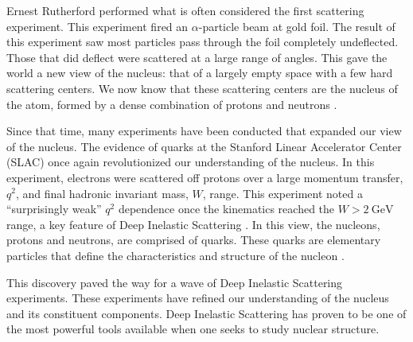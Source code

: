 
Ernest Rutherford performed what is often considered the first scattering experiment. This experiment fired an $\alpha$-particle beam at gold foil. The result of this experiment saw most particles pass through the foil completely undeflected. Those that did deflect were scattered at a large range of angles. This gave the world a new view of the nucleus: that of a largely empty space with a few hard scattering centers. We now know that these scattering centers are the nucleus of the atom, formed by a dense combination of protons and neutrons \cite{GRIF}.

Since that time, many experiments have been conducted that expanded our view of the nucleus. The evidence of quarks at the Stanford Linear Accelerator Center (SLAC) once again revolutionized our understanding of the nucleus. In this experiment, electrons were scattered off protons over a large momentum transfer, $q^2$, and final hadronic invariant mass, $W$, range. This experiment noted a ``surprisingly weak'' $q^2$ dependence once the kinematics reached the $W>2\ \textrm{GeV}$ range, a key feature of Deep Inelastic Scattering \cite{SLAC_DIS}. In this view, the nucleons, protons and neutrons, are comprised of quarks. These quarks are elementary particles that define the characteristics and structure of the nucleon \cite{DoQ}.

This discovery paved the way for a wave of Deep Inelastic Scattering experiments. These experiments have refined our understanding of the nucleus and its constituent components. Deep Inelastic Scattering has proven to be one of the most powerful tools available when one seeks to study nuclear structure.

